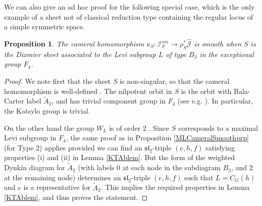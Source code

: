 \documentclass{amsart}
\newtheorem{proposition}[theorem]{Proposition}
\theoremstyle{remark}
\numberwithin{theorem}{section}
\numberwithin{equation}{section}
\begin{document}
We can also give an ad hoc proof for the following special case, which is the only example of a sheet not of classical reduction type containing the regular locus of a simple symmetric space.

\begin{proposition}\label{F4CameralSmoothprp}
    The cameral homomorphism $\kappa_S:\mathcal I_S^{sm}\rightarrow \rho_S^*\hat{\mathcal J}$ is smooth when $S$ is the Dixmier sheet associated to the Levi subgroup $L$ of type $B_3$ in the exceptional group $F_4$.
\end{proposition}

\begin{proof}
We note first that the sheet $S$ is non-singular, so that the cameral homomorphism is well-defined \cite{Bulois}. The nilpotent orbit in $S$ is the orbit with Bala-Carter label $\tilde{A}_2$, and has trivial component group in $F_4$ (see e.g. \cite[Theorem 7.1.6 and Section 8.4]{CMcG}). In particular, the Katsylo group is trivial. 

On the other hand the group $W_L$ is of order 2 \cite{Howlett}. Since $S$ corresponds to a maximal Levi subgroup in $F_4$, the same proof as in Proposition \ref{MLCameralSmoothprp} (for Type 2) applies provided we can find an $\mathfrak{sl}_2$-triple $(e,h,f)$ satisfying properties (i) and (ii) in Lemma \ref{KTAblem}. But the form of the weighted Dynkin diagram for $\tilde{A}_2$ (with labels $0$ at each node in the subdiagram $B_3$, and $2$ at the remaining node) determines an $\mathfrak{sl}_2$-triple $(e,h,f)$ such that $L = C_G(h)$ and $e$ is a representative for $\tilde{A}_2$. This implies the required properties in Lemma \ref{KTAblem}, and thus proves the statement.
\end{proof}



\end{document}
